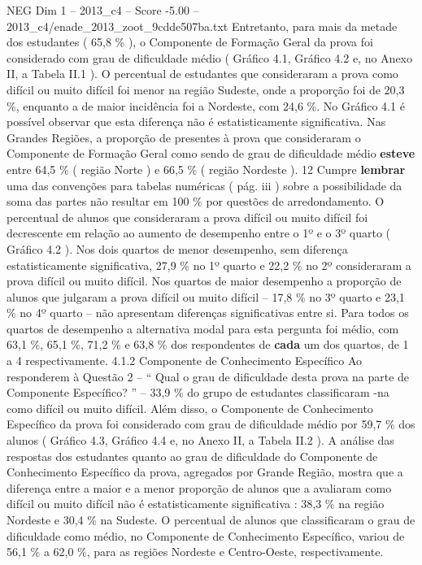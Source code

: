 \begin{textsample}{NEG Dim 1 – 2013\_c4 – Score -5.00 – 2013\_c4/enade\_2013\_zoot\_9cdde507ba.txt}
Entretanto, para mais da metade dos estudantes ( 65,8 \% ), o Componente de Formação Geral da prova foi considerado com grau de dificuldade médio ( Gráfico 4.1, Gráfico 4.2 e, no Anexo II, a Tabela II.1 ).
O percentual de estudantes que consideraram a prova como difícil ou muito difícil foi menor na região Sudeste, onde a proporção foi de 20,3 \%, enquanto a de maior incidência foi a Nordeste, com 24,6 \%.
No Gráfico 4.1 é possível observar que esta diferença não é estatisticamente significativa.
Nas Grandes Regiões, a proporção de presentes à prova que consideraram o Componente de Formação Geral como sendo de grau de dificuldade médio \textbf{esteve} entre 64,5 \% ( região Norte ) e 66,5 \% ( região Nordeste ). 12 Cumpre \textbf{lembrar} uma das convenções para tabelas numéricas ( pág. iii ) sobre a possibilidade da soma das partes não resultar em 100 \% por questões de arredondamento.
O percentual de alunos que consideraram a prova difícil ou muito difícil foi decrescente em relação ao aumento de desempenho entre o 1º e o 3º quarto ( Gráfico 4.2 ).
Nos dois quartos de menor desempenho, sem diferença estatisticamente significativa, 27,9 \% no 1º quarto e 22,2 \% no 2º consideraram a prova difícil ou muito difícil.
Nos quartos de maior desempenho a proporção de alunos que julgaram a prova difícil ou muito difícil – 17,8 \% no 3º quarto e 23,1 \% no 4º quarto – não apresentam diferenças significativas entre si.
Para todos os quartos de desempenho a alternativa modal para esta pergunta foi médio, com 63,1 \%, 65,1 \%, 71,2 \% e 63,8 \% dos respondentes de \textbf{cada} um dos quartos, de 1 a 4 respectivamente. 4.1.2 Componente de Conhecimento Específico Ao responderem à Questão 2 – “ Qual o grau de dificuldade desta prova na parte de Componente Específico? ” – 33,9 \% do grupo de estudantes classificaram -na como difícil ou muito difícil.
Além disso, o Componente de Conhecimento Específico da prova foi considerado com grau de dificuldade médio por 59,7 \% dos alunos ( Gráfico 4.3, Gráfico 4.4 e, no Anexo II, a Tabela II.2 ).
A análise das respostas dos estudantes quanto ao grau de dificuldade do Componente de Conhecimento Específico da prova, agregados por Grande Região, mostra que a diferença entre a maior e a menor proporção de alunos que a avaliaram como difícil ou muito difícil não é estatisticamente significativa : 38,3 \% na região Nordeste e 30,4 \% na Sudeste.
O percentual de alunos que classificaram o grau de dificuldade como médio, no Componente de Conhecimento Específico, variou de 56,1 \% a 62,0 \%, para as regiões Nordeste e Centro-Oeste, respectivamente.

\end{textsample}
